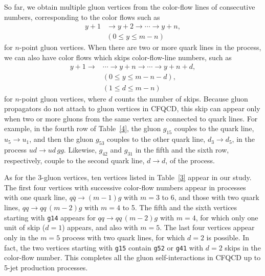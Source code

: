 So far, we obtain multiple gluon vertices from the color-flow lines of consecutive numbers, corresponding to the color flows
such as
\begin{align}
  y+1&\rightarrow y+2\rightarrow \cdots \rightarrow y+n,\nonumber\\
    &(0\leq y\leq m-n)
\end{align}
 for $n$-point gluon
vertices. When there are two or more quark lines in
the process, we can also have color flows which skips color-flow-line numbers, such as
\begin{align}
 y+1\rightarrow& \cdots \rightarrow y+n\rightarrow \cdots \rightarrow y+n+d,\nonumber\\
 &(0\leq y \leq m-n-d),\nonumber\\
  &(1 \leq d\leq m-n)
\end{align}
for $n$-point gluon vertices, where $d$ counts the number of
skips. Because gluon propagators do not attach to gluon vertices in CFQCD, this skip can appear only when
two or more gluons from the same vertex are connected to quark lines.
 For example, in the fourth row of Table~\ref{4},
the gluon $g_{15}$ couples to the quark line, $u_5\rightarrow u_1$,
and then
the gluon $g_{53}$ couples to the other quark line, $d_3\rightarrow d_5$, in the
process $ud\rightarrow ud\,gg$. Likewise, $g_{42}$ and $g_{31}$ in the
fifth and the sixth row, respectively, couple to the
second quark line, $d\rightarrow d$, of the process.

As for the 3-gluon vertices, ten vertices listed in
Table~\ref{3} appear in our study. The first four vertices with
successive color-flow numbers appear in processes with one quark line,
$q\overline{q}\rightarrow (m-1)g$
with $m=3$ to $6$, and those with two quark lines, $qq\rightarrow
qq\,(m-2)g$ with $m=4$ to 5. The fifth
and the sixth vertices starting with {\tt g14} appears for $qq\rightarrow qq\,(m-2)g$
with $m=4$, for which only one unit of skip ($d=1$) appears, and
also with $m=5$. The
last four vertices appear only in the $m=5$ process with two quark lines, for which
$d=2$ is possible. In fact, the two vertices starting with {\tt g15}
contain {\tt g52} or {\tt g41} with $d=2$ skips in the color-flow
number. This completes all the gluon self-interactions in CFQCD up to
5-jet production processes.

